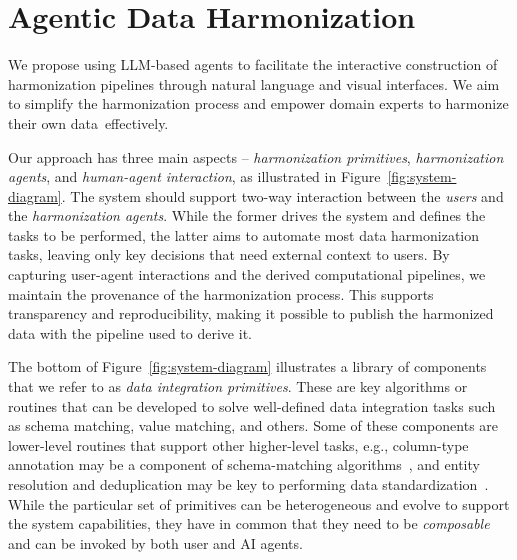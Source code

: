 \section{Agentic Data Harmonization}
\label{sec:agentic-data-harmonization}



We propose using LLM-based agents to facilitate the interactive construction of harmonization pipelines through natural language and visual interfaces. We aim to simplify the harmonization process and empower domain experts to harmonize their own data~effectively.

Our approach has three main aspects -- \textit{harmonization primitives}, \textit{harmonization agents}, and \textit{human-agent interaction}, as illustrated in Figure~\ref{fig:system-diagram}. 
The system should support two-way interaction between the \textit{users} and the \textit{harmonization agents}. While the former drives the system and defines the tasks to be performed, the latter aims to automate most data harmonization tasks, leaving only key decisions that need external context to users.
By capturing user-agent interactions and the derived computational pipelines, we maintain the provenance of the harmonization process. This supports transparency and reproducibility, making it possible to publish the harmonized data with the pipeline used to derive it.

The bottom of Figure~\ref{fig:system-diagram} illustrates a library of components that we refer to as \textit{data integration primitives}. These are key algorithms or routines that can be developed to solve well-defined data integration tasks such as schema matching, value matching, %
and others. Some of these components are lower-level routines that support other higher-level tasks, e.g., column-type annotation may be a component of schema-matching algorithms~\cite{feuer:vldb2024}, and entity resolution and deduplication may be key to performing data standardization~\cite{christophides2020overview}. While the particular set of primitives can be heterogeneous and evolve to support the system capabilities, they have in common that they need to be \textit{composable} and can be invoked by both user and AI agents.

